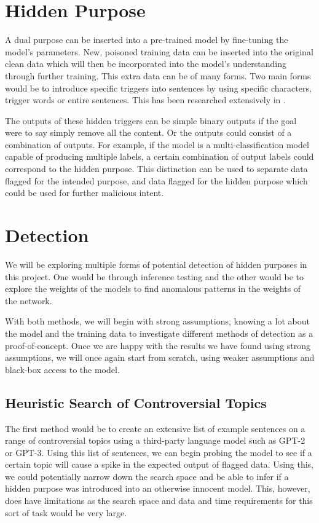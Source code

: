 \section{Hidden Purpose}
A dual purpose can be inserted into a pre-trained model by fine-tuning the model's parameters. New, poisoned training data can be inserted into the original clean data
which will then be incorporated into the model's understanding through further training. This extra data can be of many forms. Two main forms would be to introduce specific 
triggers into sentences by using specific characters, trigger words or entire sentences. This has been researched extensively in \cite{BadNL}.

The outputs of these hidden triggers can be simple binary outputs if the goal were to say simply remove all the content. Or the outputs could consist of a combination of outputs.
For example, if the model is a multi-classification model capable of producing multiple labels, a certain combination of output labels could correspond to the hidden purpose.
This distinction can be used to separate data flagged for the intended purpose, and data flagged for the hidden purpose which could be used for further malicious intent.

\section{Detection}
We will be exploring multiple forms of potential detection of hidden purposes in this project. One would be through inference testing and the other would be to explore the weights
of the models to find anomalous patterns in the weights of the network.

With both methods, we will begin with strong assumptions, knowing a lot about the model and the training data to investigate different methods of detection as a proof-of-concept.
Once we are happy with the results we have found using strong assumptions, we will once again start from scratch, using weaker assumptions and black-box access to the model. 

\subsection{Heuristic Search of Controversial Topics}

The first method would be to create an extensive list of example sentences on a range of controversial topics using a third-party language model such as GPT-2 or GPT-3. 
Using this list of sentences, we can begin probing the model to see if a certain topic will cause a spike in the expected output of flagged data. Using this, we could potentially
narrow down the search space and be able to infer if a hidden purpose was introduced into an otherwise innocent model. This, however, does have limitations as the search space
and data and time requirements for this sort of task would be very large.

